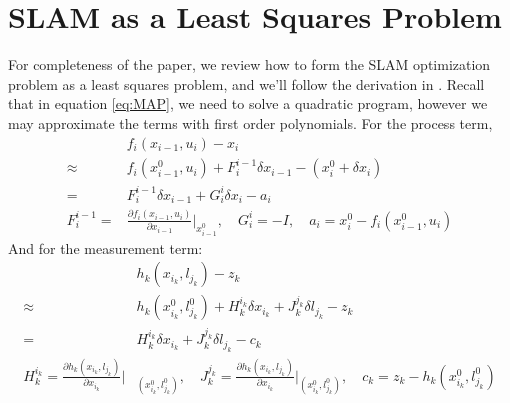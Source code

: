 \newpage
\appendix
\section{SLAM as a Least Squares Problem}
\label{appendix:leastsquare}
For completeness of the paper, we review how to form the SLAM optimization problem as a least squares problem, and we'll follow the derivation in \cite{isam}. Recall that in equation \ref{eq:MAP}, we need to solve a quadratic program, however we may approximate the terms with first order polynomials. For the process term,
\begin{equation}
\begin{aligned}
&f_i(x_{i-1}, u_i) - x_i\\
\approx & {f_i(x_{i-1}^0, u_i)} + F_i^{i-1}\delta x_{i-1} - (x_i^0 + \delta x_i)\\
=& F_i^{i-1}\delta x_{i-1} + G_i^i\delta x_i - a_i \\
F_i^{i-1} =& \frac{\partial f_i(x_{i-1}, u_i)}{\partial x_{i-1}}|_{x_{i-1}^0}, \quad G_i^i = -I,\quad a_i = x_i^0 - f_i(x_{i-1}^0, u_i)
\end{aligned}
\label{eq:linearProcessTerm}
\end{equation}
And for the measurement term:
\begin{equation}
\begin{aligned}
&h_k(x_{i_k}, l_{j_k}) - z_k\\
\approx &{h_k(x_{i_k}^0, l_{j_k}^0) + H_k^{i_k}\delta x_{i_k} + J_k^{j_k}\delta l_{j_k}} - z_k\\
=&{H_k^{i_k}\delta x_{i_k} + J_k^{j_k}\delta l_{j_k}} - c_k\\
H_k^{i_k} = \frac{\partial h_k(x_{i_k}, l_{j_k})}{\partial x_{i_k}}|&_{(x_{i_k}^0, l_{j_k}^0)},\quad J_k^{j_k} = \frac{\partial h_k(x_{i_k}, l_{j_k})}{\partial x_{i_k}}|_{(x_{i_k}^0, l_{j_k}^0)} ,\quad c_k = z_k - h_k(x_{i_k}^0, l_{j_k}^0)
\end{aligned}
\label{eq:linearMeasurementTerm}
\end{equation}


